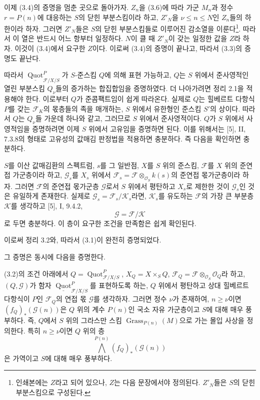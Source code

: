 이제 (3.4)의 증명을 멈춘 곳으로 돌아가자. $Z_n$을 (3.6)에 따라 가군
$M_n$과 정수 $r=P(n)$에 대응하는 $S$의 닫힌 부분스킴이라 하고,
$Z'_N$을 $\nu\leq n\leq N$인 $Z_n$들의 하한이라 하자. 그러면
$Z'_N$들은 $S$의 닫힌 부분스킴들로 이루어진 감소열을 이룬다\footnote{인쇄본에는 $Z$라고 되어 있으나, $Z$는 다음 문장에서야 정의된다.
$Z'_N$들은 $S$의 닫힌 부분스킴으로 구성된다.}. 따라서 이 열은 반드시
어느 항부터 일정하다. $N$이 클 때 $Z'_N$이 갖는 일정한 값을 $Z$라 하자.
이것이 (3.4)에서 요구한 $Z$이다. 이로써 (3.4)의 증명이 끝나고, 따라서
(3.3)의 증명도 끝난다.

따라서 $\underline{\operatorname{Quot}}^P_{\mathcal F/X/S}$가
$S$-준스킴 $Q$에 의해 표현 가능하고, $Q$는 $S$ 위에서 준사영적인 열린
부분스킴 $Q_\nu$들의 증가하는 합집합임을 증명하였다. 더 나아가려면
정리 2.1을 적용해야 한다. 이로부터 $Q$가 준콤팩트임이 쉽게 따라온다.
실제로 $Q$는 힐베르트 다항식 $P$를 갖는 $\mathcal F_K$의 몫층들의 족을
매개하는, $S$ 위에서 유한형인 준스킴 $S'$의 상이다. 따라서 $Q$는
$Q_\nu$들 가운데 하나와 같고, 그러므로 $S$ 위에서 준사영적이다. $Q$가
$S$ 위에서 사영적임을 증명하려면 이제 $S$ 위에서 고유임을 증명하면
된다. 이를 위해서는 [5], II, 7.3.8의 형태로 고유성의 값매김 판정법을
적용하면 충분하다. 즉 다음을 확인하면 충분하다.

 $S$를 이산 값매김환의 스펙트럼, $s$를 그 일반점,
$X$를 $S$ 위의 준스킴, $\mathcal F$를 $X$ 위의 준연접 가군층이라 하고,
$\mathcal G_s$를 $X_s$ 위에서
$\mathcal F_s=\mathcal F\otimes_{\mathcal O_S}k(s)$의 준연접 몫가군층이라 하자.
그러면 $\mathcal F$의 준연접 몫가군층 $\mathcal G$로서 $S$ 위에서 평탄하고
$X_s$로 제한한 것이 $\mathcal G_s$인 것은 유일하게 존재한다.
실제로 $\mathcal G_s=\mathcal F_s/\mathcal K_s$라면, $\mathcal K_s$를
유도하는 $\mathcal F$의 가장 큰 부분층 $\mathcal K$를 생각하고 [5], I,
9.4.2,
\[
\mathcal G=\mathcal F/\mathcal K
\]
로 두면 충분하다. 이 층이 요구한 조건을 만족함은 쉽게 확인된다.

이로써 정리 3.2와, 따라서 (3.1)이 완전히 증명되었다.

그 증명은 동시에 다음을 증명한다.

 (3.2)의 조건 아래에서
$Q=\operatorname{Quot}^P_{\mathcal F/X/S}$,
$X_Q=X\times_SQ$,
$\mathcal F_Q=\mathcal F\otimes_{\mathcal O_S}\mathcal O_Q$라 하고,
$(Q,\mathcal G)$가 함자
$\underline{\operatorname{Quot}}^P_{\mathcal F/X/S}$를 표현하도록 하는,
$Q$ 위에서 평탄하고 상대 힐베르트 다항식이 $P$인 $\mathcal F_Q$의
연접 몫 $\mathcal G$를 생각하자. 그러면 정수 $\nu$가 존재하여,
$n\geq\nu$이면 $(f_Q)_*(\mathcal G(n))$은 $Q$ 위의 계수 $P(n)$인
국소 자유 가군층이고 $S$에 대해 매우 풍부하다. 즉, $Q$에서 $S$ 위의
그라스만 스킴 $\operatorname{Grass}_{P(n)}(M)$으로 가는 몰입 사상을
정의한다. 특히 $n\geq\nu$이면 $Q$ 위의 층
\[
\bigwedge^{P(n)}(f_Q)_*(\mathcal G(n))
\]
은 가역이고 $S$에 대해 매우 풍부하다.

